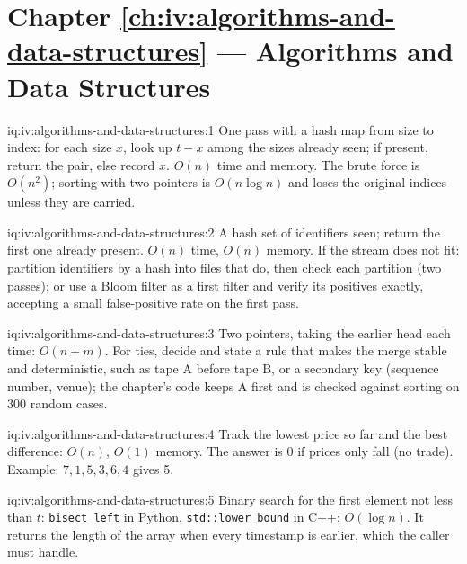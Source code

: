 \section*{Chapter \ref{ch:iv:algorithms-and-data-structures} --- Algorithms and Data Structures}

\begin{solution}{iq:iv:algorithms-and-data-structures:1}
One pass with a hash map from size to index: for each size $x$, look up $t - x$ among the sizes already seen; if present,
return the pair, else record $x$. $O(n)$ time and memory. The brute force is $O(n^2)$; sorting with two pointers is $O(n\log n)$
and loses the original indices unless they are carried.
\end{solution}

\begin{solution}{iq:iv:algorithms-and-data-structures:2}
A hash set of identifiers seen; return the first one already present. $O(n)$ time, $O(n)$ memory. If the stream does not fit:
partition identifiers by a hash into files that do, then check each partition (two passes); or use a Bloom filter as a first
filter and verify its positives exactly, accepting a small false-positive rate on the first pass.
\end{solution}

\begin{solution}{iq:iv:algorithms-and-data-structures:3}
Two pointers, taking the earlier head each time: $O(n + m)$. For ties, decide and state a rule that makes the merge stable and
deterministic, such as tape A before tape B, or a secondary key (sequence number, venue); the chapter's code keeps A first and
is checked against sorting on 300 random cases.
\end{solution}

\begin{solution}{iq:iv:algorithms-and-data-structures:4}
Track the lowest price so far and the best difference: $O(n)$, $O(1)$ memory. The answer is 0 if prices only fall (no trade).
Example: $7, 1, 5, 3, 6, 4$ gives 5.
\end{solution}

\begin{solution}{iq:iv:algorithms-and-data-structures:5}
Binary search for the first element not less than $t$: \texttt{bisect\_left} in Python, \texttt{std::lower\_bound} in C++;
$O(\log n)$. It returns the length of the array when every timestamp is earlier, which the caller must handle.
\end{solution}

